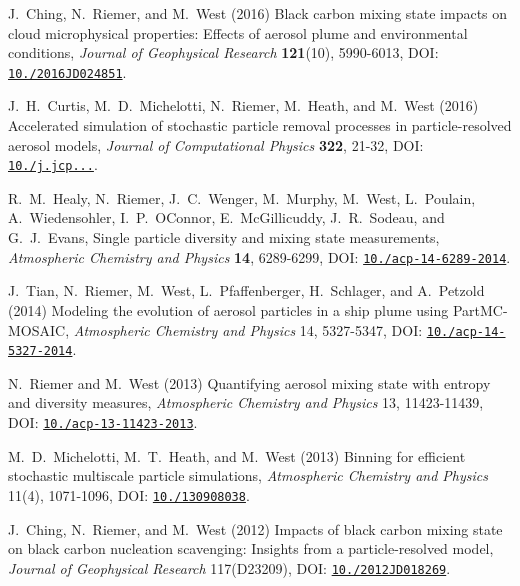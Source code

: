 
\begin{DoxyItemize}
\item J.~Ching, N.~Riemer, and M.~West (2016) Black carbon mixing state impacts on cloud microphysical properties\+: Effects of aerosol plume and environmental conditions, {\itshape Journal of Geophysical Research} {\bfseries 121}(10), 5990-\/6013, D\+OI\+: \href{http://dx.doi.org/10.1002/2016JD024851}{\tt 10./2016\+J\+D024851}.
\item J.~H.~Curtis, M.~D.~Michelotti, N.~Riemer, M.~Heath, and M.~West (2016) Accelerated simulation of stochastic particle removal processes in particle-\/resolved aerosol models, {\itshape Journal of Computational Physics} {\bfseries 322}, 21-\/32, D\+OI\+: \href{http://dx.doi.org/10.1016/j.jcp.2016.06.029}{\tt 10./j.jcp...}.
\item R.~M.~Healy, N.~Riemer, J.~C.~Wenger, M.~Murphy, M.~West, L.~Poulain, A.~Wiedensohler, I.~P.~O\textquotesingle{}Connor, E.~Mc\+Gillicuddy, J.~R.~Sodeau, and G.~J.~Evans, Single particle diversity and mixing state measurements, {\itshape Atmospheric Chemistry and Physics} {\bfseries 14}, 6289-\/6299, D\+OI\+: \href{http://dx.doi.org/10.5194/acp-14-6289-2014}{\tt 10./acp-\/14-\/6289-\/2014}.
\item J.~Tian, N.~Riemer, M.~West, L.~Pfaffenberger, H.~Schlager, and A.~Petzold (2014) Modeling the evolution of aerosol particles in a ship plume using Part\+M\+C-\/\+M\+O\+S\+A\+IC, {\itshape Atmospheric Chemistry and Physics} 14, 5327-\/5347, D\+OI\+: \href{http://dx.doi.org/10.5194/acp-14-5327-2014}{\tt 10./acp-\/14-\/5327-\/2014}.
\item N.~Riemer and M.~West (2013) Quantifying aerosol mixing state with entropy and diversity measures, {\itshape Atmospheric Chemistry and Physics} 13, 11423-\/11439, D\+OI\+: \href{http://dx.doi.org/10.5194/acp-13-11423-2013}{\tt 10./acp-\/13-\/11423-\/2013}.
\item M.~D.~Michelotti, M.~T.~Heath, and M.~West (2013) Binning for efficient stochastic multiscale particle simulations, {\itshape Atmospheric Chemistry and Physics} 11(4), 1071-\/1096, D\+OI\+: \href{http://dx.doi.org/10.1137/130908038}{\tt 10./130908038}.
\item J.~Ching, N.~Riemer, and M.~West (2012) Impacts of black carbon mixing state on black carbon nucleation scavenging\+: Insights from a particle-\/resolved model, {\itshape Journal of Geophysical Research} 117(D23209), D\+OI\+: \href{http://dx.doi.org/10.1029/2012JD018269}{\tt 10./2012\+J\+D018269}.

\end{DoxyItemize}
